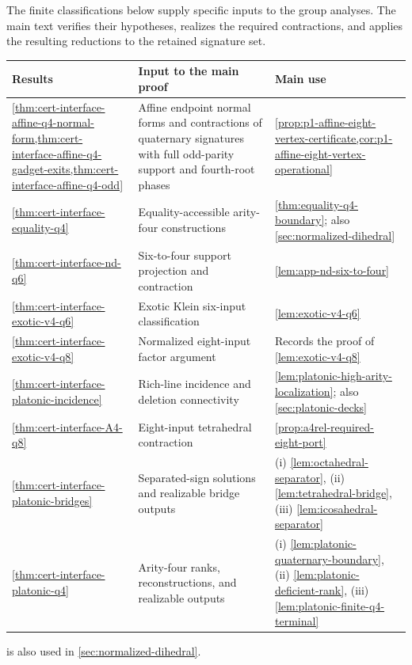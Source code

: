 \documentclass[11pt,letterpaper,onecolumn]{article}
\theoremstyle{plain}
\theoremstyle{definition}
\theoremstyle{remark}
\begin{document}
The finite classifications below supply specific inputs to the group
analyses. The main text verifies their hypotheses, realizes the required
contractions, and applies the resulting reductions to the retained signature set.
\begin{center}
\normalsize
\begin{tabularx}{\textwidth}{@{}l>{\raggedright\arraybackslash}X>{\raggedright\arraybackslash}X@{}}
\toprule
Results & Input to the main proof & Main use\\
\midrule
\cref{thm:cert-interface-affine-q4-normal-form,thm:cert-interface-affine-q4-gadget-exits,thm:cert-interface-affine-q4-odd}
& Affine endpoint normal forms and contractions of quaternary signatures with full odd-parity support and fourth-root phases
& \cref{prop:p1-affine-eight-vertex-certificate,cor:p1-affine-eight-vertex-operational}\\
\cref{thm:cert-interface-equality-q4}
& Equality-accessible arity-four constructions
& \cref{thm:equality-q4-boundary}; also \cref{sec:normalized-dihedral}\\
\cref{thm:cert-interface-nd-q6}
& Six-to-four support projection and contraction
& \cref{lem:app-nd-six-to-four}\\
\cref{thm:cert-interface-exotic-v4-q6}
& Exotic Klein six-input classification
& \cref{lem:exotic-v4-q6}\\
\cref{thm:cert-interface-exotic-v4-q8}
& Normalized eight-input factor argument
& Records the proof of \cref{lem:exotic-v4-q8}\\
\cref{thm:cert-interface-platonic-incidence}
& Rich-line incidence and deletion connectivity
& \cref{lem:platonic-high-arity-localization}; also \cref{sec:platonic-decks}\\
\cref{thm:cert-interface-A4-q8}
& Eight-input tetrahedral contraction
& \cref{prop:a4rel-required-eight-port}\\
\cref{thm:cert-interface-platonic-bridges}
& Separated-sign solutions and realizable bridge outputs
& (i) \cref{lem:octahedral-separator}, (ii) \cref{lem:tetrahedral-bridge},
  (iii) \cref{lem:icosahedral-separator}\\
\cref{thm:cert-interface-platonic-q4}
& Arity-four ranks, reconstructions, and realizable outputs
& (i) \cref{lem:platonic-quaternary-boundary},
  (ii) \cref{lem:platonic-deficient-rank}, (iii) \cref{lem:platonic-finite-q4-terminal}\\
\bottomrule
\end{tabularx}
\end{center}
 is also used in
\cref{sec:normalized-dihedral}.
\end{document}
